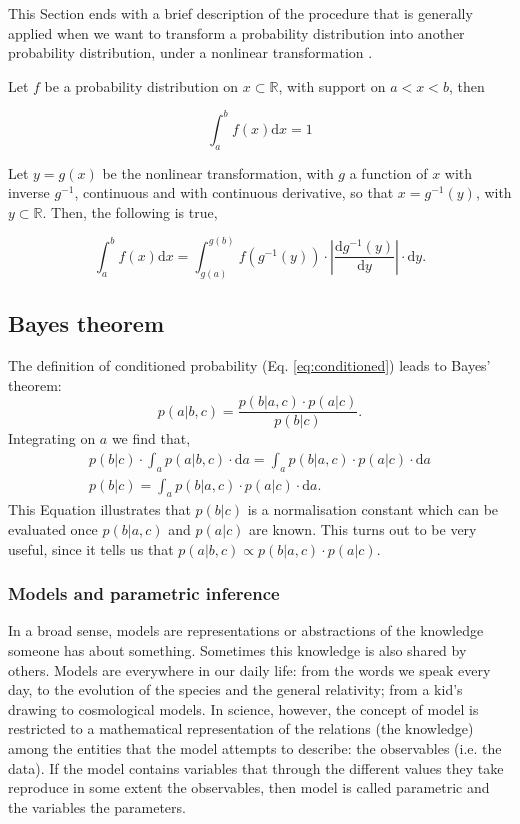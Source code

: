 This Section ends with a brief description of the procedure that is generally applied when we want to transform a probability distribution into another probability distribution, under a nonlinear transformation \cite[for more details see for example][pages 18 and 19]{Bishop2006}. 

Let  $f$ be a probability distribution on $x\subset\mathbb{R}$, with support on $a<x<b$, then

\begin{equation}
\int_a^b f(x) \mathrm{d}x = 1 \nonumber
\end{equation}

Let $y=g(x)$ be the nonlinear transformation, with $g$ a function of $x$ with inverse $g^{-1}$, continuous and with continuous derivative, so that $x=g^{-1}(y)$, with $y\subset \mathbb{R}$. Then, the following is true,

\begin{equation}
\label{eq:transformdistribution}
\int_a^b f(x) \mathrm{d}x = \int_{g(a)}^{g(b)} f(g^{-1}(y))\cdot \left|\frac{\mathrm{d}g^{-1}(y)}{\mathrm{d}y}\right|\cdot \mathrm{d}y.
\end{equation}

\subsection{Bayes theorem}
The definition of conditioned probability (Eq. \ref{eq:conditioned}) leads to Bayes' theorem:
\begin{equation}
p(a|b,c) = \frac{p(b|a,c)\cdot p(a|c)}{p(b|c)}.
\end{equation}
Integrating on $a$ we find that,
\begin{align}
\label{eq:evidence}
p(b|c) \cdot \int_a p(a|b,c)\cdot \mathrm{d}a = \int_a p(b|a,c) \cdot p(a|c) \cdot \mathrm{d}a \nonumber \\
p(b|c) = \int_a p(b|a,c) \cdot p(a|c) \cdot \mathrm{d}a.
\end{align}
This Equation illustrates that $p(b|c)$ is a normalisation constant which can be evaluated once $p(b|a,c)$ and $p(a|c)$ are known. This turns out to be very useful, since it tells us that $p(a|b,c) \propto p(b|a,c) \cdot p(a|c)$.

\subsubsection{Models and parametric inference}
\label{sect:parametric_inference}
In a broad sense, models are representations or abstractions of the knowledge someone has about something. Sometimes this knowledge is also shared by others. Models are everywhere in our daily life: from the words we speak every day, to the evolution of the species and the general relativity; from a kid's drawing to cosmological models. In science, however, the concept of model is restricted to a mathematical representation of the relations (the knowledge) among the entities that the model attempts to describe: the observables (i.e. the data). If the model contains variables that through the different values they take reproduce in some extent the observables, then model is called parametric and the variables the parameters. 

